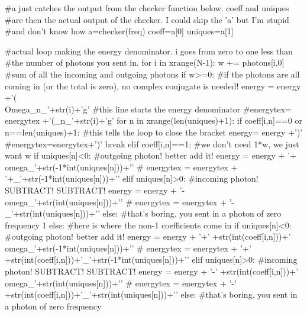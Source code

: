 \documentclass[11pt,a4paper,notitlepage]{article}
\begin{document}
\begin{code}
    #a just catches the output from the checker function below. coeff and uniques
    #are then the actual output of the checker. I could skip the 'a' but I'm stupid
    #and don't know how
    a=checker(freq)
    coeff=a[0]
    uniques=a[1]

    #actual loop making the energy denominator. i goes from zero to one less than
    #the number of photons you sent in.
    for i in xrange(N-1):
        w += photons[i,0] #sum of all the incoming and outgoing photons
        if w>=0: #if the photons are all coming in (or the total is zero), no complex conjugate is needed!
            energy = energy +'(\\Omega_{n_{'+str(i)+'}g}' #this line starts the energy denominator
            #energytex= energytex +'(\Omega_{n_{'+str(i)+'}g}'
            for n in xrange(len(uniques)+1):
                if coeff[i,n]==0 or n==len(uniques)+1: #this tells the loop to close the bracket
                    energy= energy +')'
                    #energytex=energytex+')'
                    break
                elif coeff[i,n]==1: #we don't need 1*w, we just want w
                    if uniques[n]<0: #outgoing photon! better add it!
                        energy = energy + '+\\omega_{'+str(-1*int(uniques[n]))+'}'
                   #     energytex = energytex + '+\omega_{'+str(-1*int(uniques[n]))+'}'
                    elif uniques[n]>0: #incoming photon! SUBTRACT! SUBTRACT!
                        energy = energy + '-\\omega_{'+str(int(uniques[n]))+'}'
                  #      energytex = energytex + '-\omega_{'+str(int(uniques[n]))+'}'
                    else: #that's boring. you sent in a photon of zero frequency
                        1
                else: #here is where the non-1 coefficients come in
                    if uniques[n]<0: #outgoing photon! better add it!
                        energy = energy + '+' +str(int(coeff[i,n]))+'\\omega_{'+str(-1*int(uniques[n]))+'}'
                 #       energytex = energytex + '+' +str(int(coeff[i,n]))+'\omega_{'+str(-1*int(uniques[n]))+'}'
                    elif uniques[n]>0: #incoming photon! SUBTRACT! SUBTRACT!
                        energy = energy + '-' +str(int(coeff[i,n]))+'\\omega_{'+str(int(uniques[n]))+'}'
                #        energytex = energytex + '-' +str(int(coeff[i,n]))+'\omega_{'+str(int(uniques[n]))+'}'
                    else: #that's boring. you sent in a photon of zero frequency

\end{code}
\end{document}
